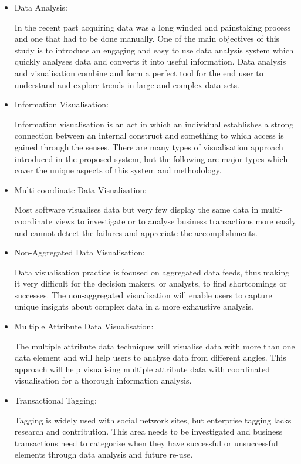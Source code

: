 \begin{itemize}
\item Data Analysis: 

In the recent past acquiring data was a long winded and painstaking process and one that had to be done manually. One of the main objectives of this study is to introduce an engaging and easy to use data analysis system which quickly analyses data and converts it into useful information. Data analysis and visualisation combine and form a perfect tool for the end user to understand and explore trends in large and complex data sets.

\item Information Visualisation:

Information visualisation is an act in which an individual establishes a strong connection between an internal construct and something to which access is gained through the senses. There are many types of visualisation approach introduced in the proposed system, but the following are major types which cover the unique aspects of this system and methodology. 

\item Multi-coordinate Data Visualisation:

Most software visualises data but very few display the same data in multi-coordinate views to investigate or to analyse business transactions more easily and cannot detect the failures and appreciate the accomplishments.

\item Non-Aggregated Data Visualisation:

Data visualisation practice is focused on aggregated data feeds, thus making it very difficult for the decision makers, or analysts, to find shortcomings or successes. The non-aggregated visualisation will enable users to capture unique insights about complex data in a more exhaustive analysis.

\item Multiple Attribute Data Visualisation:

The multiple attribute data techniques will visualise data with more than one data element and will help users to analyse data from different angles. This approach will help visualising multiple attribute data with coordinated visualisation for a thorough information analysis.

\item Transactional Tagging:

Tagging is widely used with social network sites, but enterprise tagging lacks research and contribution. This area needs to be investigated and business transactions need to categorise when they have successful or unsuccessful elements through data analysis and future re-use.


\end{itemize}
